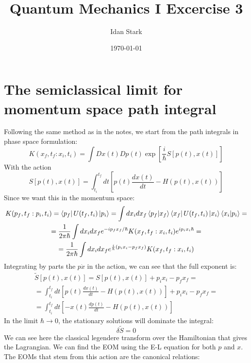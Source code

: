 \documentclass{article}
\title{Quantum Mechanics I Excercise 3}
\author{Idan Stark}
\date{\today}
\begin{document}
\maketitle

\section{The semiclassical limit for momentum space path integral}
Following the same method as in the notes, we start from the path integrals in phase space formulation:
\begin{equation}
    K(x_f, t_f : x_i, t_i) = \int Dx(t) Dp(t) \exp[\frac{i}{\hbar}S\left[p(t), x(t)\right]]
\end{equation}
With the action
\begin{equation}
    S\left[p(t), x(t)\right] = \int_{t_i}^{t_f} dt \left[p(t) \frac{dx(t)}{dt} - H(p(t), x(t))\right]
\end{equation}
Since we want this in the momentum space:
\begin{equation}
\begin{gathered}
    K(p_f, t_f : p_i, t_i) = \bra{p_f}U(t_f, t_i)\ket{p_i} =
    \int dx_i dx_f \bra{p_f}\ket{x_f}\bra{x_f}U(t_f, t_i)\ket{x_i}\bra{x_i}\ket{p_i} =
    \\
    = \frac{1}{2\pi\hbar}\int dx_i dx_f e^{-ip_fx_f/\hbar}K(x_f, t_f : x_i, t_i)e^{ip_ix_i\hbar} =
    \\
    = \frac{1}{2\pi\hbar}\int dx_i dx_f e^{\frac{i}{\hbar}(p_ix_i - p_fx_f)}K(x_f, t_f : x_i, t_i)
\end{gathered}
\end{equation}
Integrating by parts the $p\dot{x}$ in the action, we can see that the full exponent is:
\begin{equation}
\begin{gathered}
    \tilde{S}\left[p(t), x(t)\right] = S\left[p(t), x(t)\right] + p_ix_i - p_fx_f =
    \\
    = \int_{t_i}^{t_f} dt \left[p(t) \frac{dx(t)}{dt} - H(p(t), x(t))\right] + p_ix_i - p_fx_f = 
    \\
    = \int_{t_i}^{t_f} dt \left[-x(t) \frac{dp(t)}{dt} - H(p(t), x(t))\right]
\end{gathered}
\end{equation}
In the limit $\hbar \rightarrow 0$, the stationary solutions will dominate the integral:
\begin{equation}
    \delta \tilde{S} = 0
\end{equation}
We can see here the classical legendere transform over the Hamiltonian that gives the Lagrangian. We can find the EOM using the E-L equation for both $p$ and $x$. The EOMs that stem from this action are the canonical relations:
\end{document}
